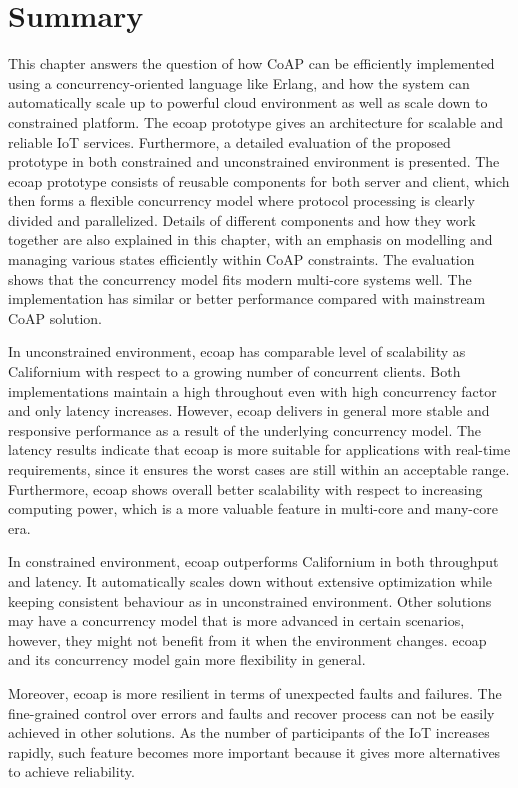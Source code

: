 \section{Summary}

This chapter answers the question of how CoAP can be efficiently implemented using a concurrency-oriented language like Erlang, and how the system can automatically scale up to powerful cloud environment as well as scale down to constrained platform. The ecoap prototype gives an architecture for scalable and reliable IoT services. Furthermore, a detailed evaluation of the proposed prototype in both constrained and unconstrained environment is presented. The ecoap prototype consists of reusable components for both server and client, which then forms a flexible concurrency model where protocol processing is clearly divided and parallelized. Details of different components and how they work together are also explained in this chapter, with an emphasis on modelling and managing various states efficiently within CoAP constraints. The evaluation shows that the concurrency model fits modern multi-core systems well. The implementation has similar or better performance compared with mainstream CoAP solution. 

In unconstrained environment, ecoap has comparable level of scalability as Californium with respect to a growing number of concurrent clients. Both implementations maintain a high throughout even with high concurrency factor and only latency increases. However, ecoap delivers in general more stable and responsive performance as a result of the underlying concurrency model. The latency results indicate that ecoap is more suitable for applications with real-time requirements, since it ensures the worst cases are still within an acceptable range. Furthermore, ecoap shows overall better scalability with respect to increasing computing power, which is a more valuable feature in multi-core and many-core era.

In constrained environment, ecoap outperforms Californium in both throughput and latency. It automatically scales down without extensive optimization while keeping consistent behaviour as in unconstrained environment. Other solutions may have a concurrency model that is more advanced in certain scenarios, however, they might not benefit from it when the environment changes. ecoap and its concurrency model gain more flexibility in general.

Moreover, ecoap is more resilient in terms of unexpected faults and failures. The fine-grained control over errors and faults and recover process can not be easily achieved in other solutions. 
As the number of participants of the IoT increases rapidly, such feature becomes more important because it gives more alternatives to achieve reliability. 



